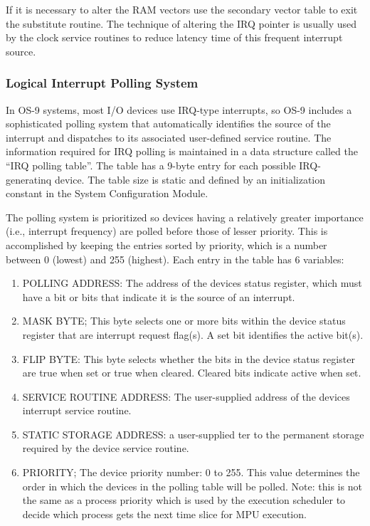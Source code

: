 \documentclass[
]{article}
\begin{document}
If it is necessary to alter the RAM vectors use the secondary vector
table to exit the substitute routine. The technique of altering the IRQ
pointer is usually used by the clock service routines to reduce latency
time of this frequent interrupt source.

\subsubsection{Logical Interrupt Polling System}

In OS-9 systems, most I/O devices use IRQ-type interrupts, so OS-9
includes a sophisticated polling system that automatically identifies
the source of the interrupt and dispatches to its associated
user-defined service routine. The information required for IRQ polling
is maintained in a data structure called the ``IRQ polling table''. The
table has a 9-byte entry for each possible IRQ-generatinq device. The
table size is static and defined by an initialization constant in the
System Configuration Module.

The polling system is prioritized so devices having a relatively greater
importance (i.e., interrupt frequency) are polled before those of lesser
priority. This is accomplished by keeping the entries sorted by
priority, which is a number between 0 (lowest) and 255 (highest). Each
entry in the table has 6 variables:

\begin{enumerate}
\def\labelenumi{\arabic{enumi}.}
\item
  POLLING ADDRESS: The address of the device\textquotesingle s status
  register, which must have a bit or bits that indicate it is the source
  of an interrupt.
\item
  MASK BYTE; This byte selects one or more bits within the device status
  register that are interrupt request flag(s). A set bit identifies the
  active bit(s).
\item
  FLIP BYTE: This byte selects whether the bits in the device status
  register are true when set or true when cleared. Cleared bits indicate
  active when set.
\item
  SERVICE ROUTINE ADDRESS: The user-supplied address of the
  device\textquotesingle s interrupt service routine.
\item
  STATIC STORAGE ADDRESS: a user-supplied ter to the permanent storage
  required by the device service routine.
\item
  PRIORITY; The device priority number: 0 to 255. This value determines
  the order in which the devices in the polling table will be polled.
  Note: this is not the same as a process priority which is used by the
  execution scheduler to decide which process gets the next time slice
  for MPU execution.
\end{enumerate}
\end{document}
